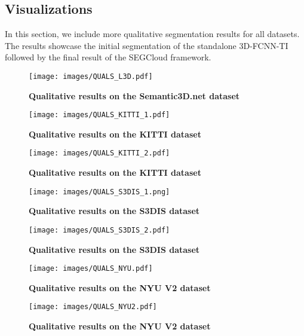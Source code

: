 \documentclass[10pt,twocolumn,letterpaper]{article}
\newcommand{\ours}[0]{SEGCloud\xspace}
\newcommand{\threedfcnn}[0]{3D-FCNN\xspace}
\begin{document}
\vspace{5mm}
\subsection{Visualizations}\label{sec:visualizations}
In this section, we include more qualitative segmentation results for all datasets. The results showcase the initial segmentation of the standalone \threedfcnn-TI followed by the final result of the \ours framework. 


\begin{figure*}
\centering
\texttt{[image: images/QUALS\_L3D.pdf]}
\caption{\small{\textbf{Qualitative results on the Semantic3D.net dataset}}}
\label{fig:quals_l3d}
\end{figure*}

\begin{figure*}
\centering
\texttt{[image: images/QUALS\_KITTI\_1.pdf]}
\caption{\small{\textbf{Qualitative results on the KITTI dataset}}}
\label{fig:quals_kitti_1}
\end{figure*}

\begin{figure*}
\centering
\texttt{[image: images/QUALS\_KITTI\_2.pdf]}
\caption{\small{\textbf{Qualitative results on the KITTI dataset}}}
\label{fig:quals_kitti_2}
\end{figure*}

\begin{figure*}
\centering
\texttt{[image: images/QUALS\_S3DIS\_1.png]}
\caption{\small{\textbf{Qualitative results on the S3DIS dataset}}}
\label{fig:quals_s3dis_1}
\end{figure*}

\begin{figure*}
\centering
\texttt{[image: images/QUALS\_S3DIS\_2.pdf]}
\caption{\small{\textbf{Qualitative results on the S3DIS dataset}}}
\label{fig:quals_s3dis_2}
\end{figure*}

\begin{figure*}
\centering
\texttt{[image: images/QUALS\_NYU.pdf]}
\caption{\small{\textbf{Qualitative results on the NYU V2 dataset}}}
\label{fig:quals_nyuv2}
\end{figure*}

\begin{figure*}
\centering
\texttt{[image: images/QUALS\_NYU2.pdf]}
\caption{\small{\textbf{Qualitative results on the NYU V2 dataset}}}
\label{fig:quals_nyuv2}
\end{figure*} \fi
\end{document}
